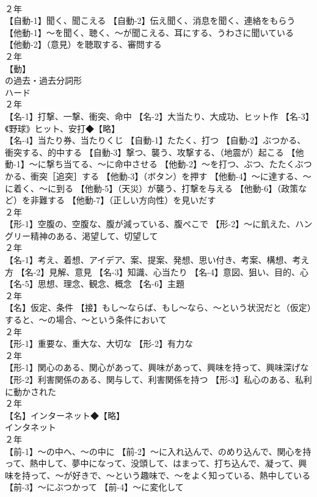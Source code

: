 \documentclass[8pt]{extreport}
\begin{document}
\begin{CJK}{UTF8}{min}
\\	２年	
\\	【自動-1】聞く、聞こえる 【自動-2】伝え聞く、消息を聞く、連絡をもらう 【他動-1】～を聞く、聴く、～が聞こえる、耳にする、うわさに聞いている 【他動-2】（意見）を聴取する、審問する
\\	２年	
\\	【動】
\\	の過去・過去分詞形 
\\	ハード
\\	２年	
\\	【名-1】打撃、一撃、衝突、命中 【名-2】大当たり、大成功、ヒット作 【名-3】《野球》ヒット、安打◆【略】
\\	【名-4】当たり券、当たりくじ 【自動-1】たたく、打つ 【自動-2】ぶつかる、衝突する、的中する 【自動-3】撃つ、襲う、攻撃する、（地震が）起こる 【他動-1】～に撃ち当てる、～に命中させる 【他動-2】～を打つ、ぶつ、たたくぶつかる、衝突［追突］する 【他動-3】（ボタン）を押す 【他動-4】～に達する、～に着く、～に到る 【他動-5】（天災）が襲う、打撃を与える 【他動-6】（政策など）を非難する 【他動-7】（正しい方向性）を見いだす
\\	２年	
\\	【形-1】空腹の、空腹な、腹が減っている、腹ぺこで 【形-2】～に飢えた、ハングリー精神のある、渇望して、切望して
\\	２年	
\\	【名-1】考え、着想、アイデア、案、提案、発想、思い付き、考案、構想、考え方 【名-2】見解、意見 【名-3】知識、心当たり 【名-4】意図、狙い、目的、心 【名-5】思想、理念、観念、概念 【名-6】主題
\\	２年	
\\	【名】仮定、条件 【接】もし～ならば、もし～なら、～という状況だと（仮定）すると、～の場合、～という条件において
\\	２年	
\\	【形-1】重要な、重大な、大切な 【形-2】有力な
\\	２年	
\\	【形-1】関心のある、関心があって、興味があって、興味を持って、興味深げな 【形-2】利害関係のある、関与して、利害関係を持つ 【形-3】私心のある、私利に動かされた
\\	２年	
\\	【名】インターネット◆【略】
\\	インタネット
\\	２年	
\\	【前-1】～の中へ、～の中に 【前-2】～に入れ込んで、のめり込んで、関心を持って、熱中して、夢中になって、没頭して、はまって、打ち込んで、凝って、興味を持って、～が好きで、～という趣味で、～をよく知っている、熱中している 【前-3】～にぶつかって 【前-4】～に変化して

\end{CJK}
\end{document}
